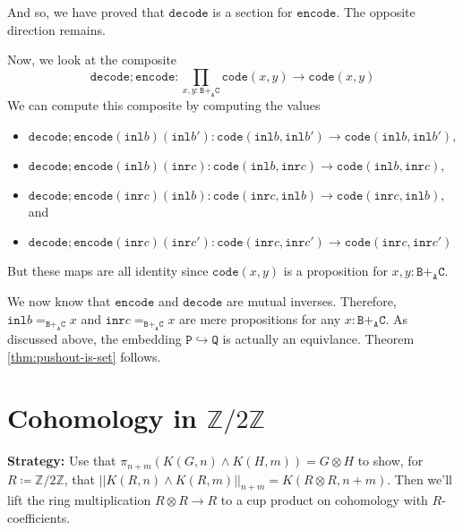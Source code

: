 \message{ !name(notes.tex)}\documentclass[12pt]{amsart}
\newcommand{\ZZ}{\mathbb{Z}}
\newcommand{\from}{\colon}
\newcommand{\type}[1]{\mathtt{#1}}
\newcommand{\tin}{\colon}
\newcommand{\A}{\type{A}}
\newcommand{\B}{\type{B}}
\newcommand{\C}{\type{C}}
\renewcommand{\P}{\type{P}}
\newcommand{\Q}{\type{Q}}
\newcommand{\BAC}{\B +_{\A} \C}
\newcommand{\inl}{\type{inl}}
\newcommand{\inr}{\type{inr}}
\newcommand{\code}{\type{code}}
\newcommand{\encode}{\type{encode}}
\newcommand{\decode}{\type{decode}}
\theoremstyle{remark}
\theoremstyle{definition}
\begin{document}
And so, we have proved that \( \decode \) is a section for \( \encode
\). The opposite direction remains.


Now, we look at the composite
\[
  \decode ; \encode \from
  \prod\limits_{x,y \tin \BAC} \code ( x,y ) \to
  \code ( x,y )
\]
We can compute this composite by computing the values
%
\begin{itemize}
\item
  \(
    \decode ; \encode (\inl b ) ( \inl b' ) \from
    \code ( \inl b , \inl b' ) \to
    \code ( \inl b , \inl b' ),
  \)
\item
  \(
    \decode ; \encode (\inl b ) ( \inr c ) \from
    \code ( \inl b , \inr c ) \to
    \code ( \inl b , \inr c ),
  \)
\item
  \(
    \decode ; \encode (\inr c ) ( \inl b ) \from
    \code ( \inr c , \inl b ) \to
    \code ( \inr c , \inl b ),
    \)
  and  
\item
  \(
    \decode ; \encode (\inr c ) ( \inr c' ) \from
    \code ( \inr c , \inr c' ) \to
    \code ( \inr c , \inr c' )
  \)
\end{itemize}
%
But these maps are all identity since \( \code (x,y) \) is a
proposition for \( x , y \tin \BAC \).   
\par


We now know that
% 
\(
    \encode
\)
%
and
%
\(
    \decode
\)
% 
are mutual inverses. Therefore,
% 
\(
    \inl b =_{ \BAC  } x
\)
% 
and
%
\(
    \inr c =_{ \BAC } x
\)
% 
are mere propositions for any
%
\(
    x \tin \BAC.
\)
% 
As discussed above, the embedding
% 
\(
    \P \hookrightarrow \Q
\)
%
is actually an equivlance. Theorem \ref{thm:pushout-is-set} follows.

\section{Cohomology in $ \ZZ/2\ZZ $}
\label{sec:cohomology--zz2zz}

\textbf{Strategy:}
Use that $ \pi_{n+m} ( K(G,n) \wedge K(H,m) ) = G \otimes H
$ to show, for $ R \coloneqq \ZZ / 2 \ZZ $, that $ || K(R,n)
\wedge K(R,m) ||_{n+m} = K( R \otimes R, n+m ) $. Then we'll
lift the ring multiplication $ R \otimes R \to R $ to a cup
product on cohomology with $ R $-coefficients.
\end{document}

